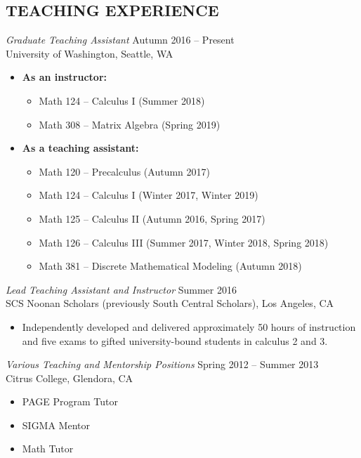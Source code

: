 \documentclass[margin, 10pt]{res} %
\begin{document}
\begin{resume}
\section{TEACHING EXPERIENCE}

{\sl Graduate Teaching Assistant} \hfill Autumn 2016 -- Present \\
University of Washington, Seattle, WA

\begin{itemize} \itemsep -1pt %
\item\textbf{As an instructor:} 
\begin{itemize}
	\item Math 124 -- Calculus I (Summer 2018)
	\item Math 308 -- Matrix Algebra (Spring 2019)
\end{itemize}
\item \textbf{As a teaching assistant:} 
\begin{itemize}
	\item Math 120 -- Precalculus (Autumn 2017)
	\item Math 124 -- Calculus I (Winter 2017, Winter 2019)
	\item Math 125 -- Calculus II (Autumn 2016, Spring 2017)
	\item Math 126 -- Calculus III (Summer 2017, Winter 2018, Spring 2018)
	\item Math 381 -- Discrete Mathematical Modeling (Autumn 2018)
\end{itemize}
\end{itemize}
 
{\sl Lead Teaching Assistant and Instructor} \hfill Summer 2016 \\
SCS Noonan Scholars (previously South Central Scholars), Los Angeles, CA
\begin{itemize} \itemsep -1pt
\item Independently developed and delivered  approximately 50 hours of instruction and five exams to gifted university-bound students in calculus 2 and 3.
\end{itemize} 

{\sl Various Teaching and Mentorship Positions} \hfill Spring 2012 -- Summer 2013 \\
Citrus College, Glendora, CA
\begin{itemize} \itemsep -1pt
\item PAGE Program Tutor
\item SIGMA Mentor
\item Math Tutor
\end{itemize} 


\end{resume}
\end{document}
